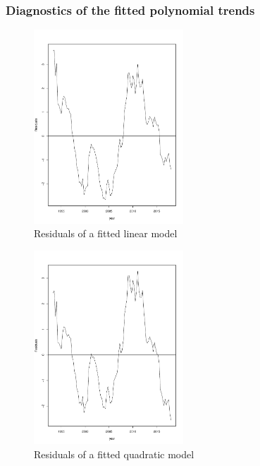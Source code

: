\documentclass[11pt,a4paper]{article}
\begin{document}
\subsubsection{Diagnostics of the fitted polynomial trends}

\begin{figure}[!htb]
\centering
\includegraphics[angle=0,
width=0.5\textwidth]{resid_linearmodel}
\caption{Residuals of a fitted linear model
\label{fig:resid_linearmodel}}
\end{figure}

\begin{figure}[!htb]
\centering
\includegraphics[angle=0,
width=0.5\textwidth]{resid_quadraticmodel}
\caption{Residuals of a fitted quadratic model
\label{fig:resid_quadraticmodel}}
\end{figure}
\end{document}
